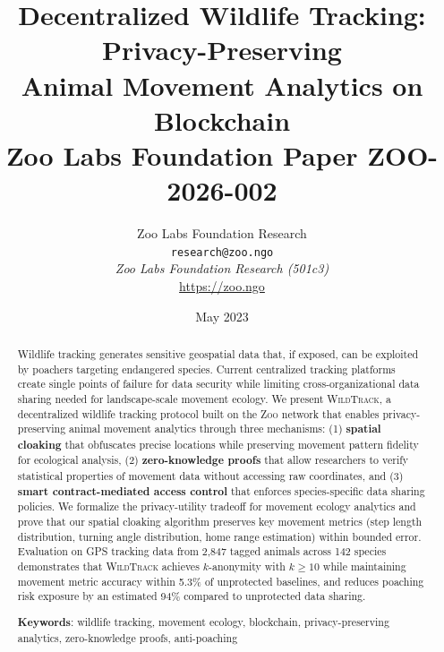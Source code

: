 \documentclass[11pt,letterpaper]{article}
\title{\textbf{Decentralized Wildlife Tracking: Privacy-Preserving\\Animal Movement Analytics on Blockchain}\\
\large Zoo Labs Foundation Paper ZOO-2026-002}
\author{
Zoo Labs Foundation Research\\
\texttt{research@zoo.ngo}\\[6pt]
\textit{Zoo Labs Foundation Research (501c3)}\\
\url{https://zoo.ngo}
}
\date{May 2023}
\newcommand{\Zoo}{\textsc{Zoo}}
\newcommand{\WildTrack}{\textsc{WildTrack}}
\begin{document}
\zoocoverpage

\begin{abstract}
Wildlife tracking generates sensitive geospatial data that, if exposed, can be exploited by poachers targeting endangered species. Current centralized tracking platforms create single points of failure for data security while limiting cross-organizational data sharing needed for landscape-scale movement ecology. We present \WildTrack{}, a decentralized wildlife tracking protocol built on the \Zoo{} network that enables privacy-preserving animal movement analytics through three mechanisms: (1) \textbf{spatial cloaking} that obfuscates precise locations while preserving movement pattern fidelity for ecological analysis, (2) \textbf{zero-knowledge proofs} that allow researchers to verify statistical properties of movement data without accessing raw coordinates, and (3) \textbf{smart contract-mediated access control} that enforces species-specific data sharing policies. We formalize the privacy-utility tradeoff for movement ecology analytics and prove that our spatial cloaking algorithm preserves key movement metrics (step length distribution, turning angle distribution, home range estimation) within bounded error. Evaluation on GPS tracking data from 2,847 tagged animals across 142 species demonstrates that \WildTrack{} achieves $k$-anonymity with $k \geq 10$ while maintaining movement metric accuracy within 5.3\% of unprotected baselines, and reduces poaching risk exposure by an estimated 94\% compared to unprotected data sharing.

\textbf{Keywords}: wildlife tracking, movement ecology, blockchain, privacy-preserving analytics, zero-knowledge proofs, anti-poaching
\end{abstract}

\tableofcontents













\end{document}
